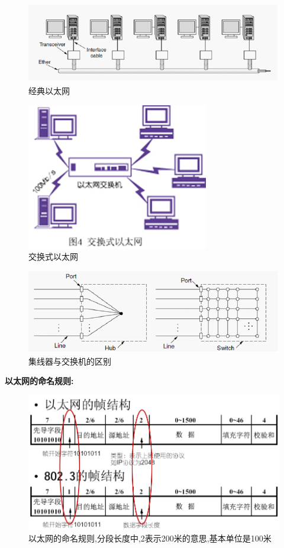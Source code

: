 \documentclass[UTF8,a4paper]{ctexart}
\newcommand{\spaceline}{\vspace{\baselineskip}}
\begin{document}
\begin{figure}[H]
  \centering
  \includegraphics[scale = 0.5]{assets/jisuanjiwangluo_b6529.png}
  \caption{经典以太网}
\end{figure}

\begin{figure}[H]
  \centering
  \includegraphics[scale = 0.5]{assets/jisuanjiwangluo_c2575.png}
  \caption{交换式以太网}
\end{figure}

\begin{figure}[H]
  \centering
  \includegraphics[scale = 0.5]{assets/jisuanjiwangluo_99ba0.png}
  \caption{集线器与交换机的区别}
\end{figure}

\spaceline
\textbf{以太网的命名规则:}
\begin{figure}[H]
  \centering
  \includegraphics[scale = 0.5]{assets/jisuanjiwangluo_7de21.png}
  \caption{以太网的命名规则,分段长度中,2表示200米的意思,基本单位是100米}
\end{figure}
\end{document}

